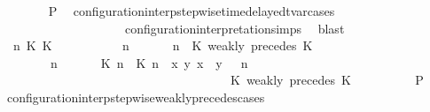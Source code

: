 \begin{isabellebody}
\ \ \ \ \ \ \isamarkupfalse%
\ {\isacharquery}P\ \isamarkupfalse%
\ configuration{\isacharunderscore}interp{\isacharunderscore}stepwise{\isacharunderscore}timedelayed{\isacharunderscore}tvar{\isacharunderscore}cases\isanewline
\ \ \ \ \ \ \ \ \ \ \ \ \ \ \ \ \ \ \ \ configuration{\isacharunderscore}interpretation{\isachardot}simps\ \isamarkupfalse%
\ blast\isanewline
\ \ \ \ \isamarkupfalse%
\isanewline
\ \ \ \ \ \ \isamarkupfalse%
\ {\isasymGamma}\ n\ K\ K\ {\isasymPsi}\ {\isasymPhi}\isanewline
\ \ \ \ \ \ \isamarkupfalse%
\ {\isacartoucheopen}{\isacharparenleft}{\isasymGamma}\ n\ {\isasymturnstile}\ {\isasymPsi}\ {\isasymtriangleright}\ {\isasymPhi}\ {\isacharequal}\ {\isacharparenleft}{\isasymGamma}{\isacharcomma}\ n\ {\isasymturnstile}\ {\isacharparenleft}{\isacharparenleft}K\ weakly\ precedes\ K\ {\isacharhash}\ {\isasymPsi}{\isacharparenright}\ {\isasymtriangleright}\ {\isasymPhi}{\isacharparenright}{\isacartoucheclose}\isanewline
\ \ \ \ \ \ \ {\isacartoucheopen}{\isacharparenleft}{\isasymGamma}\ n\ {\isasymturnstile}\ {\isasymPsi}\ {\isasymtriangleright}\ {\isasymPhi}\ {\isacharequal}\ {\isacharparenleft}{\isacharparenleft}{\isacharparenleft}{\isasymlceil}{\isacharhash}\isactrlsup {\isasymle}\ K\ n{\isacharcomma}\ {\isacharhash}\isactrlsup {\isasymle}\ K\ n{\isasymrceil}\ {\isasymin}\ {\isacharparenleft}{\isasymlambda}{\isacharparenleft}x{\isacharcomma}\ y{\isacharparenright}{\isachardot}\ x\ {\isasymle}\ y{\isacharparenright}{\isacharparenright}\ {\isacharhash}\ {\isasymGamma}{\isacharparenright}{\isacharcomma}\ n\isanewline
\ \ \ \ \ \ \ \ \ \ \ \ \ \ \ \ \ \ \ \ \ \ \ \ \ \ \ \ \ \ \ \ \ \ {\isasymturnstile}\ {\isasymPsi}\ {\isasymtriangleright}\ {\isacharparenleft}{\isacharparenleft}K\ weakly\ precedes\ K\ {\isacharhash}\ {\isasymPhi}{\isacharparenright}{\isacharparenright}{\isacartoucheclose}\isanewline
\ \ \ \ \ \ \isamarkupfalse%
\ {\isacharquery}P\ \isamarkupfalse%
\ configuration{\isacharunderscore}interp{\isacharunderscore}stepwise{\isacharunderscore}weakly{\isacharunderscore}precedes{\isacharunderscore}cases\isanewline

\end{isabellebody}
